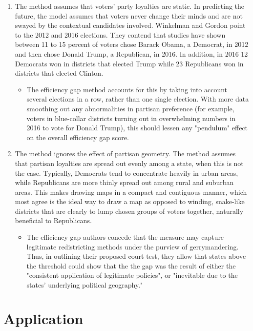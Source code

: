 \documentclass[sigconf]{acmart}
\begin{document}
\begin{enumerate}
    \item The method assumes that voters' party loyalties are static. In predicting the future, the model assumes that voters never change their minds and are not swayed by the contextual candidates involved. Winkelman and Gordon point to the 2012 and 2016 elections. They contend that studies have shown between 11 to 15 percent of voters chose Barack Obama, a Democrat, in 2012 and then chose Donald Trump, a Republican, in 2016. In addition, in 2016 12 Democrats won in districts that elected Trump while 23 Republicans won in districts that elected Clinton.
    \begin{itemize}
        \item The efficiency gap method accounts for this by taking into account several elections in a row, rather than one single election. With more data smoothing out any abnormalities in partisan preference (for example, voters in blue-collar districts turning out in overwhelming numbers in 2016 to vote for Donald Trump), this should lessen any "pendulum" effect on the overall efficiency gap score.
    \end{itemize}
    \item The method ignores the effect of partisan geometry. The method assumes that partisan loyalties are spread out evenly among a state, when this is not the case. Typically, Democrats tend to concentrate heavily in urban areas, while Republicans are more thinly spread out among rural and suburban areas. This makes drawing maps in a compact and contiguous manner, which most agree is the ideal way to draw a map as opposed to winding, snake-like districts that are clearly to lump chosen groups of voters together, naturally beneficial to Republicans.
    \begin{itemize}
        \item The efficiency gap authors concede that the measure may capture legitimate redistricting methods under the purview of gerrymandering. Thus, in outlining their proposed court test, they allow that states above the threshold could show that the the gap was the result of either the "consistent application of legitimate policies", or "inevitable due to the states' underlying political geography."\cite{chicagothreshold}
    \end{itemize}
\end{enumerate}


\section{Application}
\end{document}
